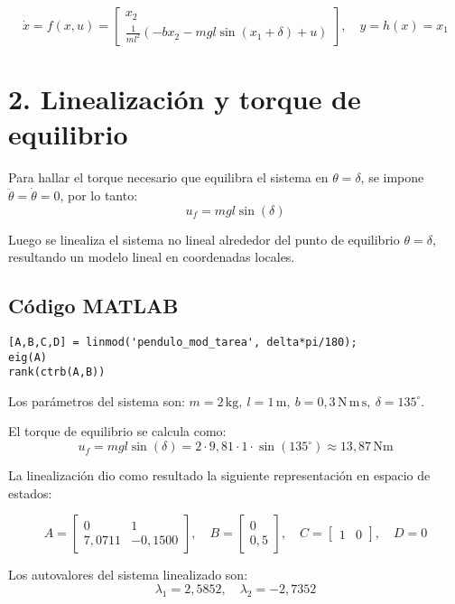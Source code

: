 \documentclass[11pt]{article}
\begin{document}
\[
\dot{x} = f(x,u) = 
\begin{bmatrix}
x_2 \\
\frac{1}{ml^2} \left( -b x_2 - mgl \sin(x_1 + \delta) + u \right)
\end{bmatrix},
\quad
y = h(x) = x_1
\]



\section*{2. Linealización y torque de equilibrio}
Para hallar el torque necesario que equilibra el sistema en $\theta = \delta$, se impone $\ddot{\theta} = \dot{\theta} = 0$, por lo tanto:
\begin{equation}
    u_f = mgl \sin(\delta)
\end{equation}

Luego se linealiza el sistema no lineal alrededor del punto de equilibrio $\theta = \delta$, resultando un modelo lineal en coordenadas locales.

\subsection*{Código MATLAB}
\begin{lstlisting}
[A,B,C,D] = linmod('pendulo_mod_tarea', delta*pi/180);
eig(A)
rank(ctrb(A,B))
\end{lstlisting}


Los parámetros del sistema son: \( m = 2 \,\mathrm{kg},\ l = 1 \,\mathrm{m},\ b = 0{,}3 \,\mathrm{N\,m\,s},\ \delta = 135^\circ \).

El torque de equilibrio se calcula como:
\[
    u_f = mgl \sin(\delta) = 2 \cdot 9{,}81 \cdot 1 \cdot \sin(135^\circ) \approx 13{,}87 \,\mathrm{Nm}
\]

La linealización dio como resultado la siguiente representación en espacio de estados:

\[
A = \begin{bmatrix}
0 & 1 \\
7{,}0711 & -0{,}1500
\end{bmatrix}, \quad
B = \begin{bmatrix}
0 \\
0{,}5
\end{bmatrix}, \quad
C = \begin{bmatrix}
1 & 0
\end{bmatrix}, \quad
D = 0
\]

Los autovalores del sistema linealizado son:
\[
\lambda_1 = 2{,}5852, \quad \lambda_2 = -2{,}7352
\]
\end{document}
